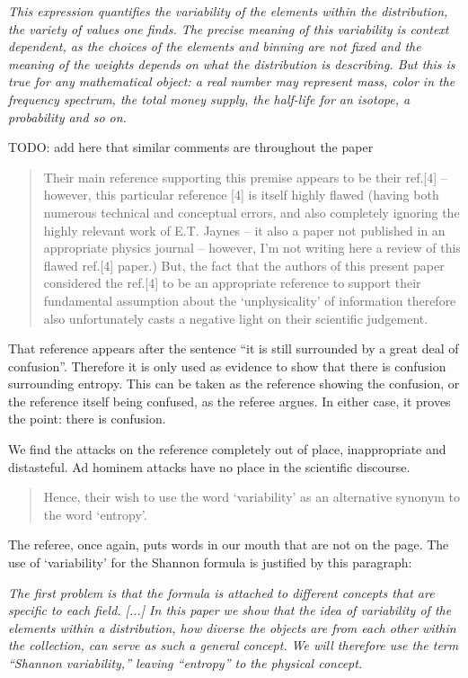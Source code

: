 \documentclass[11pt]{article}
\begin{document}
\emph{This expression quantifies the variability of the elements within the distribution, the variety of values one finds. The precise meaning of this variability is context dependent, as the choices of the elements and binning are not fixed and the meaning of the weights depends on what the distribution is describing. But this is true for any mathematical object: a real number may represent mass, color in the frequency spectrum, the total money supply, the half-life for an isotope, a probability and so on.}

TODO: add here that similar comments are throughout the paper

\begin{quote}
 Their main reference supporting this premise appears to be their ref.[4] – however, this particular reference [4] is itself highly flawed (having both numerous technical and conceptual errors, and also completely ignoring the highly relevant work of E.T. Jaynes – it also a paper not published in an appropriate physics journal – however, I’m not writing here a review of this flawed ref.[4] paper.) But, the fact that the authors of this present paper considered the ref.[4] to be an appropriate reference to support their fundamental assumption about the ‘unphysicality’ of information therefore also unfortunately casts a negative light on their scientific judgement.
\end{quote}
That reference appears after the sentence ``it is still surrounded by a great deal of confusion''. Therefore it is only used as evidence to show that there is confusion surrounding entropy. This can be taken as the reference showing the confusion, or the reference itself being confused, as the referee argues. In either case, it proves the point: there is confusion.

We find the attacks on the reference completely out of place, inappropriate and distasteful. Ad hominem attacks have no place in the scientific discourse.

\begin{quote}
Hence, their wish to use the word ‘variability’ as an alternative synonym to the word ‘entropy’.
\end{quote}

The referee, once again, puts words in our mouth that are not on the page. The use of `variability' for the Shannon formula is justified by this paragraph:

\emph{The first problem is that the formula is attached to different concepts that are specific to each field. [...] In this paper we show that the idea of variability of the elements within a distribution, how diverse the objects are from each other within the collection, can serve as such a general concept. We will therefore use the term \emph{``Shannon variability,''} leaving ``entropy'' to the physical concept.}
\end{document}

